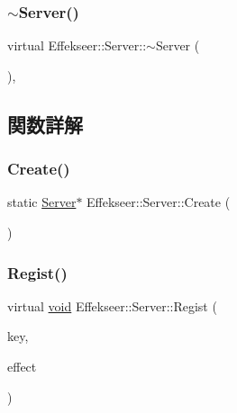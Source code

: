 \subsubsection{\texorpdfstring{$\sim$\+Server()}{~Server()}}
{\footnotesize\ttfamily virtual Effekseer\+::\+Server\+::$\sim$\+Server (\begin{DoxyParamCaption}{ }\end{DoxyParamCaption})\hspace{0.3cm}{\ttfamily [inline]}, {\ttfamily [virtual]}}



\subsection{関数詳解}
\mbox{\label{class_effekseer_1_1_server_a010be3e29a3551b3f2bf058b593c3eb0}} 
\subsubsection{\texorpdfstring{Create()}{Create()}}
{\footnotesize\ttfamily static \mbox{\hyperlink{class_effekseer_1_1_server}{Server}}$\ast$ Effekseer\+::\+Server\+::\+Create (\begin{DoxyParamCaption}{ }\end{DoxyParamCaption})\hspace{0.3cm}{\ttfamily [static]}}

\mbox{\label{class_effekseer_1_1_server_aadfbaeb38b0d1fb33ad6646430de45b0}} 
\subsubsection{\texorpdfstring{Regist()}{Regist()}}
{\footnotesize\ttfamily virtual \mbox{\hyperlink{namespace_effekseer_ab34c4088e512200cf4c2716f168deb56}{void}} Effekseer\+::\+Server\+::\+Regist (\begin{DoxyParamCaption}\item[{const \mbox{\hyperlink{_effekseer_8h_a50b026abea014b47854bcd835b3b6233}{E\+F\+K\+\_\+\+C\+H\+AR}} $\ast$}]{key,  }\item[{\mbox{\hyperlink{class_effekseer_1_1_effect}{Effect}} $\ast$}]{effect }\end{DoxyParamCaption})\hspace{0.3cm}{\ttfamily [pure virtual]}}



